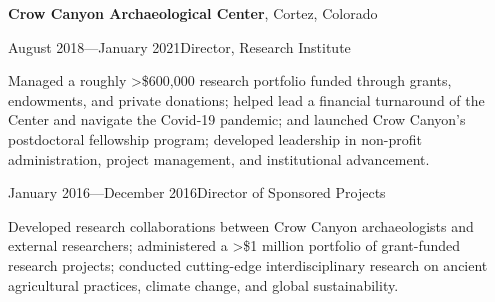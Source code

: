 {\bf Crow Canyon Archaeological Center}, Cortez, Colorado
\begin{list1}

\item[] August 2018—January 2021\hspace{.2cm}Director, Research Institute
\begin{list2}
\item[] Managed a roughly >\$600,000 research portfolio funded through grants, endowments, and private donations; helped lead a financial turnaround of the Center and navigate the Covid-19 pandemic; and launched Crow Canyon’s postdoctoral fellowship program; developed leadership in non-profit administration, project management, and institutional advancement.
\end{list2}

\vspace{0.1in}

\item[] January 2016—December 2016\hspace{.2cm}Director of Sponsored Projects
\begin{list2}
\item[] Developed research collaborations between Crow Canyon archaeologists and external researchers; administered a >\$1 million portfolio of grant-funded research projects; conducted cutting-edge interdisciplinary research on ancient agricultural practices, climate change, and global sustainability.
\end{list2}

%
\end{list1}

